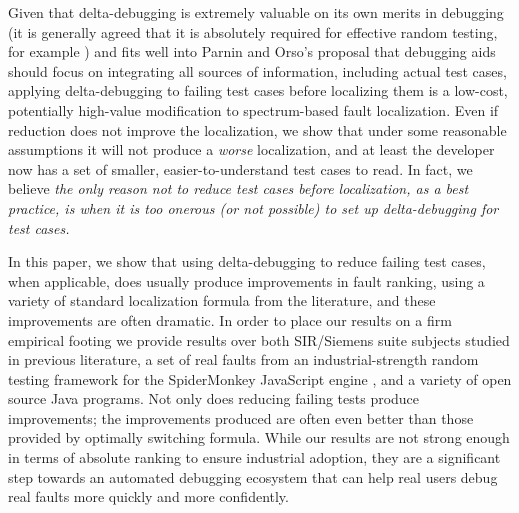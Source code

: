 Given that delta-debugging is extremely valuable on
its own merits in debugging (it is generally agreed that it is
absolutely required for effective random testing, for example
\cite{MinUnit,ICSEDiff,TCminim}) and fits well into Parnin and Orso's
proposal that debugging aids should focus on integrating all sources
of information, including actual test cases, applying delta-debugging
to failing test cases before localizing them is a low-cost,
potentially high-value modification to spectrum-based fault
localization.  Even if reduction does not improve the localization, we
show that under some reasonable assumptions it will not produce a
\emph{worse} localization, and at least the developer now has a set of
smaller, easier-to-understand test cases to read.  In fact, we believe
\emph{the only reason not to reduce test cases before localization, as a
best practice, is when it is too onerous (or not possible) to set up
delta-debugging for test cases.}

In this paper, we show that using delta-debugging to reduce failing
test cases, when applicable, does usually produce improvements in
fault ranking, using a variety of standard localization formula from
the literature, and these improvements are often dramatic.  In order
to place our results on a firm empirical footing \cite{Threats} we
provide results over both SIR/Siemens \cite{Siemens} suite subjects
studied in previous literature, a set of real faults from an
industrial-strength random testing framework for the SpiderMonkey
JavaScript engine \cite{icst2014,jsfunfuzz}, and a variety of open
source Java programs.  Not only does reducing failing tests produce
improvements; the improvements produced are often even better than
those provided by optimally switching formula.  While our results are
not strong enough in terms of absolute ranking to ensure industrial
adoption, they are a significant step towards an automated debugging
ecosystem that can help real users debug real faults more quickly and
more confidently.
